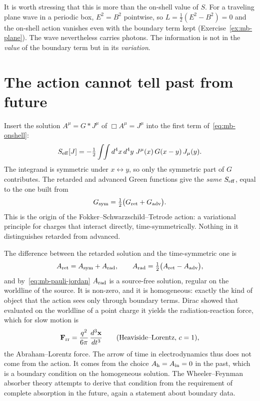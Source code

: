 It is worth stressing that this is more than the on-shell value of $S$. For
a traveling plane wave in a periodic box, $E^2=B^2$ pointwise, so
$L=\tfrac12(E^2-B^2)=0$ and the on-shell action vanishes even with the
boundary term kept (Exercise~\ref{ex:mb-plane}). The wave nevertheless
carries photons. The information is not in the \emph{value} of the
boundary term but in its \emph{variation}.

\section{The action cannot tell past from future}
\label{sec:mb-arrow}

Insert the solution $A^\mu=G*J^\mu$ of $\Box A^\mu=J^\mu$ into the first
term of~\eqref{eq:mb-onshell}:
\begin{equation}
S_{\rm eff}[J]=-\tfrac12\int\!\!\int d^4x\,d^4y\;J^\mu(x)\,G(x-y)\,J_\mu(y).
\end{equation}
The integrand is symmetric under $x\leftrightarrow y$, so only the
symmetric part of $G$ contributes. The retarded and advanced Green
functions give the \emph{same} $S_{\rm eff}$, equal to the one built from
\begin{equation}
G_{\rm sym}=\tfrac12\big(G_{\rm ret}+G_{\rm adv}\big).
\end{equation}
This is the origin of the Fokker--Schwarzschild--Tetrode action: a
variational principle for charges that interact directly, time-symmetrically.
Nothing in it distinguishes retarded from advanced.

The difference between the retarded solution and the time-symmetric one is
\begin{equation}
A_{\rm ret}=A_{\rm sym}+A_{\rm rad},\qquad
A_{\rm rad}=\tfrac12\big(A_{\rm ret}-A_{\rm adv}\big),
\label{eq:mb-dirac}
\end{equation}
and by~\eqref{eq:mb-pauli-jordan} $A_{\rm rad}$ is a source-free solution,
regular on the worldline of the source. It is non-zero, and it is
homogeneous: exactly the kind of object that the action sees only through
boundary terms. Dirac showed that evaluated on the worldline of a point
charge it yields the radiation-reaction force, which for slow motion is
\begin{equation}
\mathbf F_{\rm rr}=\frac{q^2}{6\pi}\,\frac{d^3\mathbf x}{dt^3}
\qquad(\text{Heaviside--Lorentz, }c=1),
\end{equation}
the Abraham--Lorentz force. The arrow of time in electrodynamics thus does
not come from the action. It comes from the choice $A_{\rm h}=A_{\rm in}=0$
in the past, which is a boundary condition on the homogeneous solution. The
Wheeler--Feynman absorber theory attempts to derive that condition from the
requirement of complete absorption in the future, again a statement about
boundary data.

